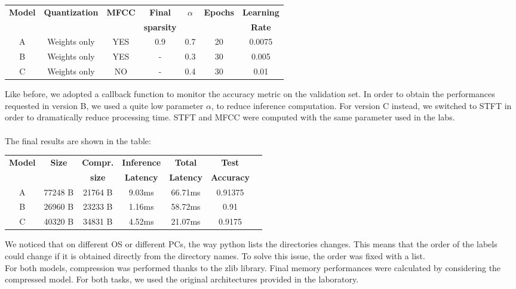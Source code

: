 \documentclass{article}
\begin{document}
\begin{center}
\begin{tabular}{|c|c|c|c|c|c|c|}
\hline
\vspace{-0.1cm}

\textbf{Model} &\textbf{Quantization} &\textbf{MFCC} &\textbf{Final} & \textbf{$\alpha$} &\textbf{Epochs} &\textbf{Learning} \\

&&&\textbf{sparsity}&&&\textbf{Rate} \\
\hline
A & Weights only & YES &0.9 & 0.7  & 20  & 0.0075\\
B& Weights only & YES &- &  0.3   & 30 & 0.005\\ 
C & Weights only & NO &- &  0.4   & 30 & 0.01\\ 

\hline
\end{tabular}
\end{center}
Like before, we adopted a callback function to monitor the accuracy metric on the validation set.
In order to obtain the performances requested in version B, we used a quite low parameter $\alpha$, to reduce inference computation. For version C instead, we switched to STFT in order to dramatically reduce processing time.
STFT and MFCC were computed with the same parameter used in the labs.
\\\\
The final results are shown in the table:
\begin{center}
\begin{tabular}{|c|c|c|c|c|c|c|}
\hline
\vspace{-0.1cm}

\textbf{Model} &\textbf{Size} &\textbf{Compr.}&  \textbf{Inference }& \textbf{Total}  &\textbf{Test} \\
&&\textbf{size}&\textbf{Latency}&\textbf{Latency}&\textbf{Accuracy}\\
\hline
A  & 77248 B & 21764 B & 9.03ms&   66.71ms  & 0.91375 \\ 
B  & 26960 B & 23233 B  &  1.16ms& 58.72ms & 0.91 \\ 
C  & 40320 B & 34831 B  & 4.52ms & 21.07ms  & 0.9175 \\ 

\hline
\end{tabular}
\end{center}
We noticed that on different OS or different PCs, the way python lists the directories changes. This means that the order of the labels could change if it is obtained directly from the directory names.
To solve this issue, the order was fixed with a list.
\\
For both models, compression was performed thanks to the zlib library. Final memory performances were calculated by considering the compressed model.
For both tasks, we used the original architectures provided in the laboratory.
\end{document}
